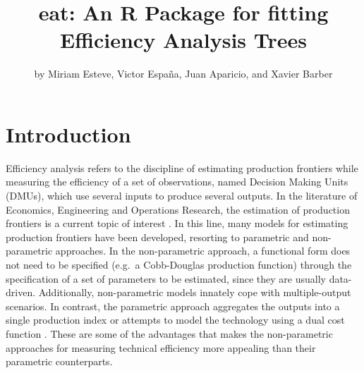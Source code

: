 \title{eat: An R Package for fitting Efficiency Analysis Trees}
\author{by Miriam Esteve, Victor España, Juan Aparicio, and Xavier Barber}

\maketitle


\hypertarget{introduction}{%
\section{Introduction}\label{introduction}}

Efficiency analysis refers to the discipline of estimating production
frontiers while measuring the efficiency of a set of observations, named
Decision Making Units (DMUs), which use several inputs to produce
several outputs. In the literature of Economics, Engineering and
Operations Research, the estimation of production frontiers is a current
topic of interest \citep[see, for
example,][]{arnaboldi2014, aparicio2017, odonell2018}. In this line,
many models for estimating production frontiers have been developed,
resorting to parametric and non-parametric approaches. In the
non-parametric approach, a functional form does not need to be specified
(e.g.~a Cobb-Douglas production function) through the specification of a
set of parameters to be estimated, since they are usually data-driven.
Additionally, non-parametric models innately cope with multiple-output
scenarios. In contrast, the parametric approach aggregates the outputs
into a single production index or attempts to model the technology using
a dual cost function \citep{orea2019}. These are some of the advantages
that makes the non-parametric approaches for measuring technical
efficiency more appealing than their parametric counterparts.

